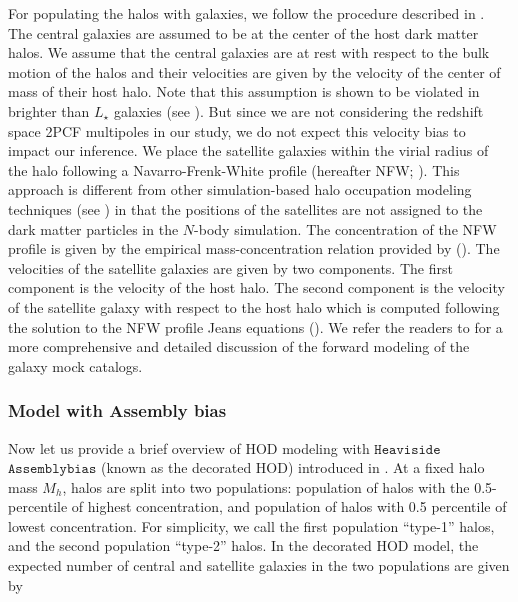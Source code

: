 For populating the halos with galaxies, we follow the procedure described in \citealt{2016arXiv160701782H,decorated}. The central galaxies are assumed to be at the center of the host dark matter halos. We assume that the central galaxies are at rest with respect to the bulk motion of the halos and their velocities are given by the velocity of the center of mass of their host halo. Note that this assumption is shown to be violated in brighter than $L_{\star}$ galaxies (see \citealt{guo2015}). But since we are not considering the redshift space 2PCF multipoles in our study, we do not expect this velocity bias to impact our inference. We place the satellite galaxies within the virial radius of the halo following a Navarro-Frenk-White profile (hereafter NFW; \citealt{nfw}). This approach is different from other simulation-based halo occupation modeling techniques (see \citealt{hod_vs_sham,zheng_guo}) in that the positions of the satellites are not assigned to the dark matter particles in the $N$-body simulation. 
The concentration of the NFW profile is given by the empirical mass-concentration relation provided by (\citealt{nfw_c(M)}). The velocities of the satellite galaxies are given by two components. The first component is the velocity of the host halo. The second component is the velocity of the satellite galaxy with respect to the host halo which is computed following the solution to the NFW profile Jeans equations (\citealt{more2010}). We refer the readers to \citealt{decorated} for a more comprehensive and detailed discussion of the forward modeling of the galaxy mock catalogs.

\subsubsection{Model with Assembly bias}\label{subsubsec:decorated}
Now let us provide a brief overview of HOD modeling with $\mathtt{Heaviside}$ $\mathtt{Assemblybias}$ (known as the decorated HOD) introduced in \citealt{decorated}. At a fixed halo mass $M_{h}$, halos are split into two populations: population of halos with the 0.5-percentile of highest concentration, and population of halos with 0.5 percentile of lowest concentration. For simplicity, we call the first population ``type-1'' halos, and the second population ``type-2'' halos. In the decorated HOD model, the expected number of central and satellite galaxies in the two populations are given by


